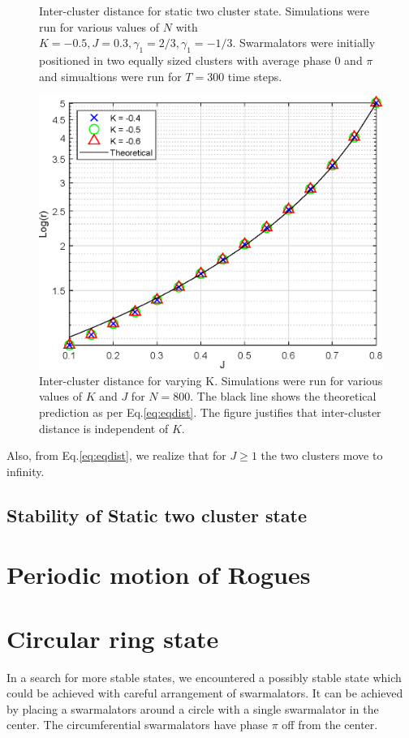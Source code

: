 \documentclass[twocolumn,10pt]{asme2ej}
\begin{document}
{{\begin{figure}[h!]
            \caption{Inter-cluster distance for static two cluster state. Simulations were run for various values of \(N\) with \(K = -0.5,J = 0.3,\gamma_1 = 2/3,\gamma_1 = -1/3\). Swarmalators were initially positioned in two equally sized clusters with average phase \(0\) and \(\pi\) and simualtions were run for \(T = 300\) time steps.}
            \label{fig:dvn}
        \end{figure}
        \begin{figure}[h!]
            \includegraphics[width = \linewidth]{interClust.eps}
            \caption{Inter-cluster distance for varying K. Simulations were run for various values of \(K\) and \(J\) for \(N = 800\). The black line shows the theoretical prediction as per Eq.\ref{eq:eqdist}. The figure justifies that inter-cluster distance is independent of \(K\).}
            \label{fig:KvJ}
        \end{figure}
        Also, from Eq.\ref*{eq:eqdist}, we realize that for \(J \geq 1\) the two clusters move to infinity. 
    }
    \subsection{Stability of Static two cluster state}
    {

    }
}

\section{Periodic motion of Rogues}

\section{Circular ring state}
{
    In a search for more stable states, we encountered a possibly stable state which could be achieved with careful arrangement of swarmalators. It can be achieved by placing a swarmalators around a circle with a single swarmalator in the center. The circumferential swarmalators have phase \(\pi\) off from the center. 
}
\end{document}
